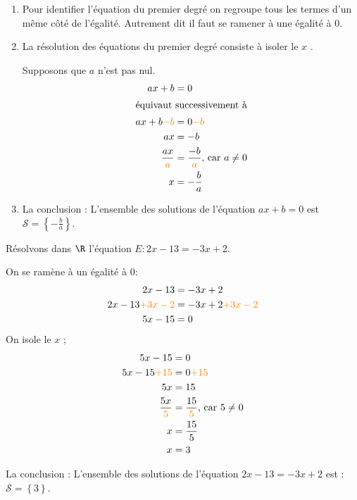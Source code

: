 \documentclass[a4paper,10pt]{report}
\begin{document}
\medskip
\begin{meth}
\begin{enumerate}
\item Pour identifier l'équation du premier degré on regroupe tous les termes d'un même côté de l'égalité. Autrement dit il faut se ramener à une égalité à $0$.
\item La résolution des équations du premier degré consiste à \og isoler le $x$ \fg{}.
	
Supposons que $a$ n'est pas nul.
\begin{align*}
ax+b&=0\\
\intertext{équivaut successivement à}
ax+b {\color{orange}-b} &= 0{\color{orange}-b}\\
ax &=-b\\
\frac{ax}{{\color{orange}a}} &= \frac{-b}{{\color{orange}a}} \text{, car $a\ne 0$}\\
x &= -\frac{b}{a}
\end{align*}

\item La conclusion : L'ensemble des solutions de l'équation $ax+b=0$ est $\mathcal{S} = \left\{ -\frac{b}{a} \right\}$.
\end{enumerate}
\end{meth}

\begin{ex}
Résolvons dans $\R$ l'équation $E : 2x-13=-3x+2$.

On se ramène à un égalité à 0:
\[
\begin{aligned}
2x-13&=-3x+2\\
2x-13 {\color{orange} + 3x -2}&=-3x+2 {\color{orange} + 3x -2}\\
5x-15 &=0\\
\end{aligned}
\]
\medskip
On \og isole le $x$ \fg{} ;
\[
\begin{aligned}
5x-15 &=0\\
5x-15 {\color{orange}+15} &= 0{\color{orange}+15}\\
5x &=15\\
\frac{5x}{{\color{orange}5}} &= \frac{15}{{\color{orange}5}} \text{, car $5 \neq 0$}\\
x &= \frac{15}{5}\\
x &= 3
\end{aligned}
\]

\medskip
La conclusion : L'ensemble des solutions de l'équation $2x-13=-3x+2$ est : $\mathcal{S} = \left\{ 3 \right\}$.
\end{ex}
\end{document}
